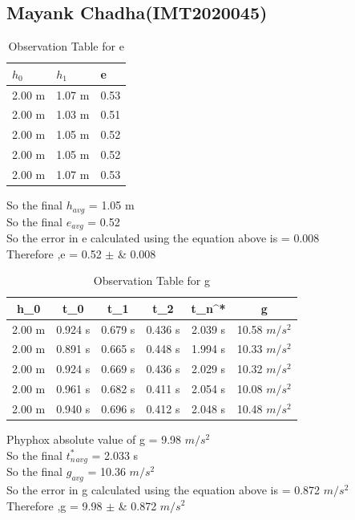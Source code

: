 \documentclass[11pt]{scrartcl} %
\begin{document}
\subsection{Mayank Chadha(IMT2020045)}

\begin{table}[h] %
	\centering %
	\begin{tabular}{l l l}
		\toprule
		\textbf{$h_0$} & \textbf{$h_1$} & \textbf{e} \\
		\midrule
		2.00 m & 1.07 m & 0.53\\
        2.00 m & 1.03 m & 0.51\\
        2.00 m & 1.05 m & 0.52\\
        2.00 m & 1.05 m & 0.52\\
        2.00 m & 1.07 m & 0.53\\
		\bottomrule
	\end{tabular}
	\caption{Observation Table for e}
\end{table}


So the final $h_{avg}$ = 1.05 m\\
So the final $e_{avg}$ = 0.52\\
So the error in e calculated using the equation above is  = 0.008 \\
Therefore ,e = 0.52  $\pm$ &  0.008 \\

\begin{table}[h]
\centering
\begin{tabular}{||c c c c c c||} 
\toprule
 \hline
 h_0 & t_0 & t_1 & t_2 & t_n^* & g \\ [0.5ex] 
 \midrule
 \hline\hline
 2.00 m & 0.924 s & 0.679 s  & 0.436 s & 2.039 s & 10.58 $m/s^2$  \\ 
 \hline
 2.00 m & 0.891 s & 0.665 s & 0.448 s & 1.994 s & 10.33 $m/s^2$  \\
 \hline
 2.00 m & 0.924 s & 0.669 s & 0.436 s & 2.029 s  & 10.32 $m/s^2$   \\
 \hline
 2.00 m & 0.961 s & 0.682 s & 0.411 s & 2.054 s  & 10.08 $m/s^2$   \\
 \hline
 2.00 m & 0.940 s & 0.696 s & 0.412 s & 2.048 s  & 10.48 $m/s^2$  \\ [1ex]
 \bottomrule
 \hline
\end{tabular}
\caption{Observation Table for g}
\end{table}


Phyphox absolute value of g = 9.98 $m/s^2$ \\
So the final $t_n^*_{avg}$ = 2.033 s\\
So the final $g_{avg}$ = 10.36 $m/s^2$\\
So the error in g calculated using the equation above is  = 0.872  $m/s^2$\\
Therefore ,g = 9.98  $\pm$ &  0.872 $m/s^2$ \\
\newpage
\end{document}
